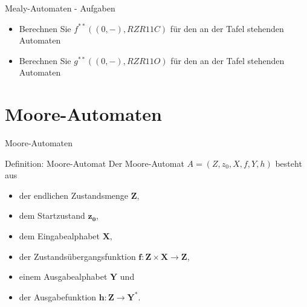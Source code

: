 	
	\begin{frame}{Mealy-Automaten - Aufgaben}
		\begin{itemize}
			\item Berechnen Sie $f^{**}((0,-), RZR11C)$ für den an der Tafel stehenden Automaten
			\item Berechnen Sie $g^{**}((0,-), RZR11O)$ für den an der Tafel stehenden Automaten
		\end{itemize}
	\end{frame}
	
	
	
	\section{Moore-Automaten}
	\begin{frame}{Moore-Automaten}
		\begin{block}{Definition: Moore-Automat}
        Der Moore-Automat $A = \left( Z, z_0, X, f, Y, h \right)$ besteht aus
        	\begin{itemize}
            	\item der endlichen Zustandsmenge $\mathbf{Z}$,
				\pause
            	\item dem Startzustand $\mathbf{z_0}$,
				\pause
            	\item dem Eingabealphabet $\mathbf{X}$,
				\pause
            	\item der Zustandsübergangsfunktion $\mathbf{f: Z\times X \rightarrow Z}$,
				\pause
            	\item einem Ausgabealphabet $\mathbf{Y}$ und
				\pause
            	\item der Ausgabefunktion $\mathbf{h: Z \rightarrow Y^*}$.
        	\end{itemize}
        \end{block}
	\end{frame}
	

